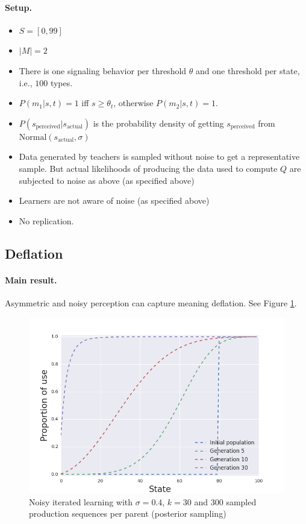 \documentclass[10pt,a4paper]{article}
\begin{document}
\paragraph{Setup.}
\begin{itemize}
  \item $S = [0,99]$
  \item $|M| = 2$
  \item There is one signaling behavior per threshold $\theta$ and one threshold per state, i.e., $100$ types.
  \item $P(m_1|s,t) = 1$ iff $s \geq \theta_t$, otherwise $P(m_2|s,t) = 1$.
  \item $P(s_{\text{perceived}} | s_{\text{actual}})$ is the probability density of getting $s_{\text{perceived}}$ from $\text{Normal}(s_{\text{actual}},\sigma)$
  \item Data generated by teachers is sampled without noise to get a representative sample. But actual likelihoods of producing the data used to compute $Q$ are subjected to noise as above (as specified above)
  \item Learners are not aware of noise (as specified above)
  \item No replication.
\end{itemize}




\subsection{Deflation}
\paragraph{Main result.} Asymmetric and noisy perception can capture meaning deflation. See Figure \ref{fig:defl}.

\begin{figure}[ht]
\centering
    \includegraphics[scale=0.5]{../code/plots/deflation-sigma04.png}
  \caption{Noisy iterated learning with $\sigma = 0.4$, $k = 30$ and $300$ sampled production sequences per parent (posterior sampling)}
  \label{fig:defl}
\end{figure}
\end{document}
